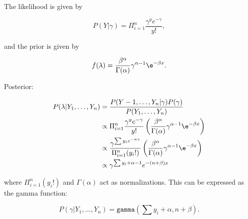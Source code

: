 The likelihood is given by

\begin{equation*}
    P(Y|\gamma) = \Pi_{i=1}^n \frac{\gamma^y e^{-\gamma}}{y!},
\end{equation*}

and the prior is given by

\begin{equation*}
    f(\lambda ) = \frac{\beta^\alpha}{\Gamma(\alpha)}\gamma^{\alpha - 1} \e^{-\beta x}.
\end{equation*}

Posterior:

\begin{align*}
    P(\lambda | Y_1, \ldots, Y_n) &= \frac{P(Y-1, \ldots, Y_n | \gamma) P(\gamma)}{P(Y_1, \ldots, Y_n)} \\
                                 & \propto \Pi_{i=1}^{n} \frac{\gamma^y e^{-\gamma}}{y!} \left( \frac{\beta^\alpha}{\Gamma(\alpha)}\gamma^{\alpha - 1} \e^{-\beta x} \right) \\
                                 & \propto \frac{\gamma^{\sum y_i e^{-n\gamma}}}{\Pi_{i=1}^n (y_i!)} \left( \frac{\beta^\alpha}{\Gamma(\alpha)}\gamma^{\alpha - 1} \e^{-\beta x} \right) \\
                                 & \propto \gamma^{\sum y_i + \alpha - 1} e^{-(n + \beta) x}
\end{align*}        

where $\Pi_{i=1}^n(y_i!)$ and $\Gamma(\alpha)$ act as normalizations. This can be expressed as the gamma function:

\begin{equation*}
    P(\gamma|Y_1, \ldots, Y_n) = \texttt{gamma} (\sum y_i + \alpha, n + \beta).
\end{equation*}


